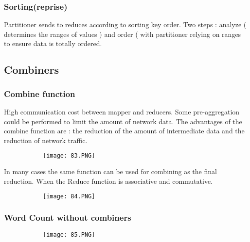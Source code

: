 \documentclass{article}
\begin{document}
\subsubsection{Sorting(reprise)}
Partitioner sends to reduces according to sorting key order.
Two steps : analyze ( determines the ranges of values ) and order ( with partitioner relying on ranges to ensure data is totally ordered.


\vspace{50mm}

\subsection{Combiners}
\subsubsection{Combine function}

High communication cost between mapper and reducers.
Some pre-aggregation could be performed to limit the amount of network data.
The advantages of the combine function are : the reduction of the amount of intermediate data and the reduction of network traffic.

\begin{figure}[ht!]
  \centering
  \begin{subfigure}[b]{0.5\linewidth}
    \texttt{[image: 83.PNG]}
  \end{subfigure}
\end{figure}

In many cases the same function can be used for combining as the final reduction.
When the Reduce function is associative and commutative.

\begin{figure}[ht!]
  \centering
  \begin{subfigure}[b]{0.5\linewidth}
    \texttt{[image: 84.PNG]}
  \end{subfigure}
\end{figure}

\subsubsection{Word Count without combiners}

\begin{figure}[ht!]
  \centering
  \begin{subfigure}[b]{0.5\linewidth}
    \texttt{[image: 85.PNG]}
  \end{subfigure}
\end{figure}
\end{document}
